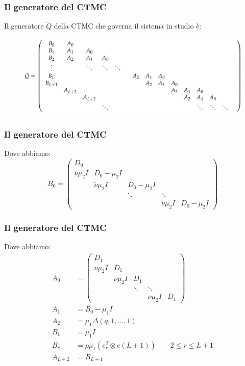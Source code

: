 \documentclass{beamer}
\begin{document}
\begin{frame}
    \frametitle{Il generatore del CTMC}
    Il generatore $\widetilde{Q}$ della CTMC che governa il sistema in studio è:
    \begin{figure}
        \centering
        \includegraphics[width=\textwidth]{Isy9B7s.png}
    \end{figure}
\end{frame}


\begin{frame}
    \frametitle{Il generatore del CTMC}
    Dove abbiamo:
    \begin{equation*}
        B_0 =
        \begin{pmatrix}
            D_0 & & & & \\
            \widetilde{\nu}\mu_2 I & D_0 - \mu_2 I & & & \\
            & \widetilde{\nu}\mu_2 I & D_0 - \mu_2 I & & \\
            & & \ddots & \ddots & \\
            & & & \widetilde{\nu}\mu_2 I & D_0 - \mu_2 I
        \end{pmatrix}
    \end{equation*}
\end{frame}


\begin{frame}
    \frametitle{Il generatore del CTMC}
    Dove abbiamo:
    \begin{equation*}
        \begin{split}
            A_0 &=
            \begin{pmatrix}
                D_1 & & & & \\
                \nu\mu_2 I & D_1 & & & \\
                & \nu \mu_2 I & D_1 & & \\
                & & \ddots & \ddots & \\
                & & & \nu \mu_2 I & D_1
            \end{pmatrix} \\
            A_1 &= B_0 -\mu_1 I \\
            A_2 & = \mu_1 \Delta(q,1, \dots, 1) \\
            B_1 &= \mu_1 I \\
            B_r &= \rho \mu_1 (e_r^T \otimes e(L+1)) \qquad 2 \leq r \leq L+1 \\
            A_{L+2} &= B_{L+1}
        \end{split}
    \end{equation*}
\end{frame}
\end{document}
